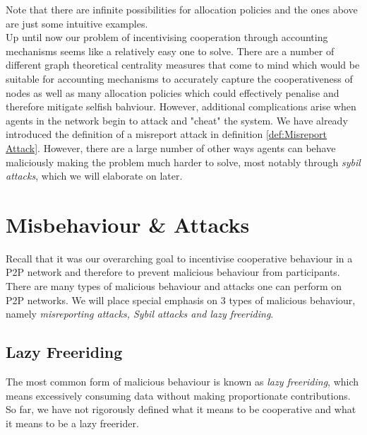 \noindent{}Note that there are infinite possibilities for allocation policies and the ones above are just some intuitive examples.\vspace{1em}\\

\noindent{}Up until now our problem of incentivising cooperation through accounting mechanisms seems like a relatively easy one to solve. There are a number of different graph theoretical centrality measures that come to mind which would be suitable for accounting mechanisms to accurately capture the cooperativeness of nodes as well as many allocation policies which could effectively penalise and therefore mitigate selfish bahviour. However, additional complications arise when agents in the network begin to attack and "cheat" the system. We have already introduced the definition of a misreport attack in definition \ref{def:Misreport Attack}. However, there are a large number of other ways agents can behave maliciously making the problem much harder to solve, most notably through {\it sybil attacks}, which we will elaborate on later. \vspace{1em}\\

\section{Misbehaviour \& Attacks}
\label{sec:Misbehaviour & Attacks}
\noindent{}Recall that it was our overarching goal to incentivise cooperative behaviour in a P2P network and therefore to prevent malicious behaviour from participants. There are many types of malicious behaviour and attacks one can perform on P2P networks. We will place special emphasis on 3 types of malicious behaviour, namely {\it misreporting attacks, Sybil attacks and lazy freeriding}. 


\subsection{Lazy Freeriding}
\label{subsec:Lazy Freeriding}
\noindent{}The most common form of malicious behaviour is known as {\it lazy freeriding}, which means excessively consuming data without making proportionate contributions. So far, we have not rigorously defined what it means to be cooperative and what it means to be a lazy freerider.\vspace{1em}\\

